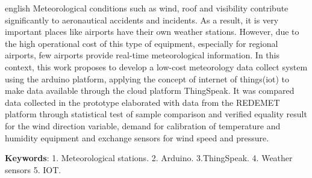 \begin{resumo}[Abstract]
 \begin{otherlanguage*}{english}
   Meteorological conditions such as wind, roof and visibility contribute significantly to aeronautical accidents and incidents. As a result, it is very important places like airports have their own weather stations. However, due to the high operational cost of this type of equipment, especially for regional airports, few airports provide real-time meteorological information. In this context, this work proposes to develop a low-cost meteorology data collect system using the arduino platform, applying the concept of internet of things(iot) to make data available through the cloud platform ThingSpeak. It was compared data collected in the prototype elaborated with data from the REDEMET platform through statistical test of sample comparison and verified equality result for the wind direction variable, demand for calibration of temperature and humidity equipment and exchange sensors for wind speed and pressure.


   \vspace{\onelineskip}
   \noindent 
   \textbf{Keywords}: 1. Meteorological stations. 2. Arduino. 3.ThingSpeak. 4. Weather sensors 5. IOT.
 \end{otherlanguage*}
\end{resumo}